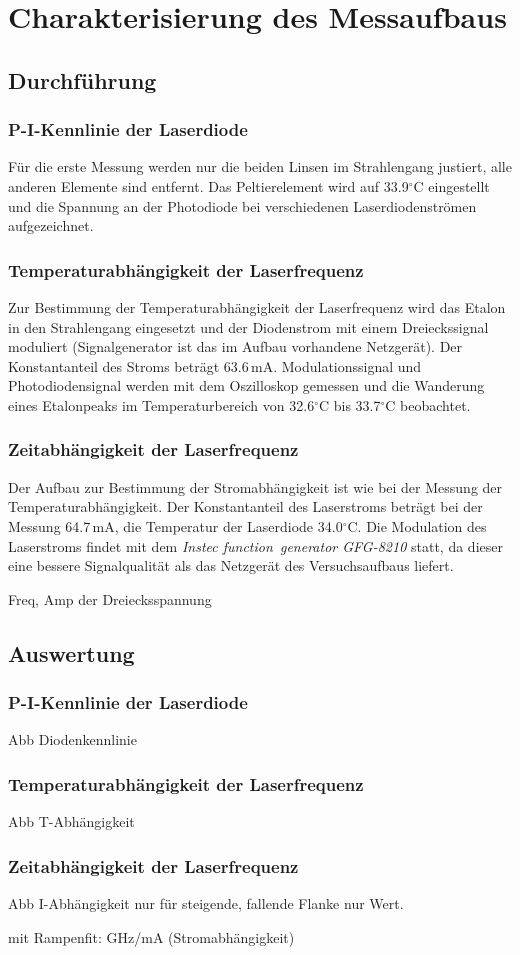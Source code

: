 \section{Charakterisierung des Messaufbaus}
\subsection{Durchführung}
\subsubsection*{P-I-Kennlinie der Laserdiode}
Für die erste Messung werden nur die beiden Linsen im Strahlengang justiert, alle anderen Elemente sind entfernt. 
Das Peltierelement wird auf 33.9$^\circ$C eingestellt und die Spannung an der
Photodiode bei verschiedenen Laserdiodenströmen aufgezeichnet.

\subsubsection*{Temperaturabhängigkeit der Laserfrequenz}
Zur Bestimmung der Temperaturabhängigkeit der
Laserfrequenz wird das Etalon in den Strahlengang eingesetzt und der Diodenstrom mit einem Dreieckssignal moduliert
(Signalgenerator ist das im Aufbau vorhandene Netzgerät).
Der Konstantanteil des Stroms beträgt 63.6\,mA.
Modulationssignal und Photodiodensignal werden mit dem Oszilloskop gemessen und die Wanderung eines Etalonpeaks
im Temperaturbereich von 32.6$^\circ$C bis 33.7$^\circ$C beobachtet.

\subsubsection*{Zeitabhängigkeit der Laserfrequenz}
Der Aufbau zur Bestimmung der Stromabhängigkeit ist
wie bei der Messung der Temperaturabhängigkeit.
Der Konstantanteil des Laserstroms beträgt bei der Messung 64.7\,mA,
die Temperatur der Laserdiode 34.0$^\circ$C.
Die Modulation des Laserstroms findet mit dem \emph{Instec function~generator GFG-8210} statt,
da dieser eine bessere Signalqualität als das Netzgerät des Versuchsaufbaus liefert.

Freq, Amp der Dreiecksspannung

\subsection{Auswertung}
\subsubsection*{P-I-Kennlinie der Laserdiode}
Abb Diodenkennlinie

\subsubsection*{Temperaturabhängigkeit der Laserfrequenz}
Abb T-Abhängigkeit

\subsubsection*{Zeitabhängigkeit der Laserfrequenz} 

Abb I-Abhängigkeit nur für steigende,
fallende Flanke nur Wert.

mit Rampenfit: GHz/mA (Stromabhängigkeit)